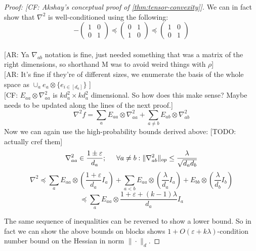 \documentclass{article}
\newcommand\eps{\varepsilon}
\newcommand{\CF}[1]{{\color{purple}[CF: #1]}}
\newcommand{\AR}[1]{{\color{orange}[AR: #1]}}
\newcommand{\TODO}[1]{{\color{blue}[TODO: #1]}}
\begin{document}
\begin{proof}[Proof: \CF{Akshay's conceptual proof of \cref{thm:tensor-convexity}}]
We can in fact show that $\nabla^{2}$ is well-conditioned using the following:
\[ -\begin{pmatrix} 1 & 0 \\ 0 & 1 \end{pmatrix}
\preceq \begin{pmatrix} 0 & 1 \\ 1 & 0 \end{pmatrix}
\preceq \begin{pmatrix} 1 & 0 \\ 0 & 1 \end{pmatrix}
\]
\\ \AR{Ya $\nabla_{ab}$ notation is fine, just needed something that was a matrix of the right dimensions, so shorthand M was to avoid weird things with $\rho$}
\\ \AR{It's fine if they're of different sizes, we enumerate the basis of the whole space as $\cup_{a} e_{a} \otimes \{e_{i \in [d_{a}]}\}$ }\\
\CF{$E_{aa} \otimes \nabla^2_{aa}$ is $k d_a^2 \times k d_a^2$ dimensional. So how does this make sense? Maybe needs to be updated along the lines of the next proof.}
\[ \nabla^{2} f = \sum_{a} E_{aa} \otimes \nabla^{2}_{aa} + \sum_{a \neq b} E_{ab} \otimes \nabla^{2}_{ab}  \]
Now we can again use the high-probability bounds derived above: \TODO{actually cref them}
\begin{align}\nabla^{2}_{aa} \in \frac{1 \pm \eps}{d_{a}}; \hspace{5mm} \forall a \neq b: \|\nabla^{2}_{ab}\|_{op} \leq \frac{\lambda}{\sqrt{d_{a} d_{b}}} \label{eq:expansion-thing}  \end{align}
\[ \nabla^{2} \preceq \sum_{a} E_{aa} \otimes \left( \frac{1+\eps}{d_{a}} I_{a} \right) + \sum_{a < b} E_{aa} \otimes \left( \frac{\lambda}{d_{a}} I_{a} \right) + E_{bb} \otimes \left( \frac{\lambda}{d_{b}} I_{b} \right)    \]
\[ \preceq \sum_{a} E_{aa} \otimes \frac{1+\eps+(k-1)\lambda}{d_{a}} I_{a}  \]

The same sequence of inequalities can be reversed to show a lower bound. So in fact we can show the above bounds on blocks shows $1+O(\eps + k \lambda)$-condition number bound on the Hessian in norm $\|\cdot\|_{d}$. 
\end{proof}
\end{document}
